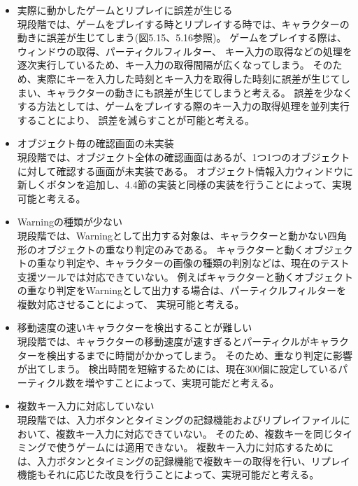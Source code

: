 \begin{itemize}
	\item 実際に動かしたゲームとリプレイに誤差が生じる\\
		現段階では、ゲームをプレイする時とリプレイする時では、キャラクターの動きに誤差が生じてしまう(図5.15、5.16参照)。
		ゲームをプレイする際は、ウィンドウの取得、パーティクルフィルター、
		キー入力の取得などの処理を逐次実行しているため、キー入力の取得間隔が広くなってしまう。
		そのため、実際にキーを入力した時刻とキー入力を取得した時刻に誤差が生じてしまい、キャラクターの動きにも誤差が生じてしまうと考える。
		誤差を少なくする方法としては、ゲームをプレイする際のキー入力の取得処理を並列実行することにより、
		誤差を減らすことが可能と考える。
			
	\item オブジェクト毎の確認画面の未実装\\
		現段階では、オブジェクト全体の確認画面はあるが、1つ1つのオブジェクトに対して確認する画面が未実装である。
		オブジェクト情報入力ウィンドウに新しくボタンを追加し、4.4節の実装と同様の実装を行うことによって、実現可能と考える。
	
	\item Warningの種類が少ない\\
		現段階では、Warningとして出力する対象は、キャラクターと動かない四角形のオブジェクトの重なり判定のみである。
		キャラクターと動くオブジェクトの重なり判定や、キャラクターの画像の種類の判別などは、現在のテスト支援ツールでは対応できていない。
		例えばキャラクターと動くオブジェクトの重なり判定をWarningとして出力する場合は、パーティクルフィルターを複数対応させることによって、
		実現可能と考える。
		
	\item 移動速度の速いキャラクターを検出することが難しい\\
		現段階では、キャラクターの移動速度が速すぎるとパーティクルがキャラクターを検出するまでに時間がかかってしまう。
		そのため、重なり判定に影響が出てしまう。
		検出時間を短縮するためには、現在300個に設定しているパーティクル数を増やすことによって、実現可能だと考える。
		
	\item 複数キー入力に対応していない\\
		現段階では、入力ボタンとタイミングの記録機能およびリプレイファイルにおいて、複数キー入力に対応できていない。
		そのため、複数キーを同じタイミングで使うゲームには適用できない。
		複数キー入力に対応するためには、入力ボタンとタイミングの記録機能で複数キーの取得を行い、リプレイ機能もそれに応じた改良を行うことによって、実現可能だと考える。
		
\end{itemize}







